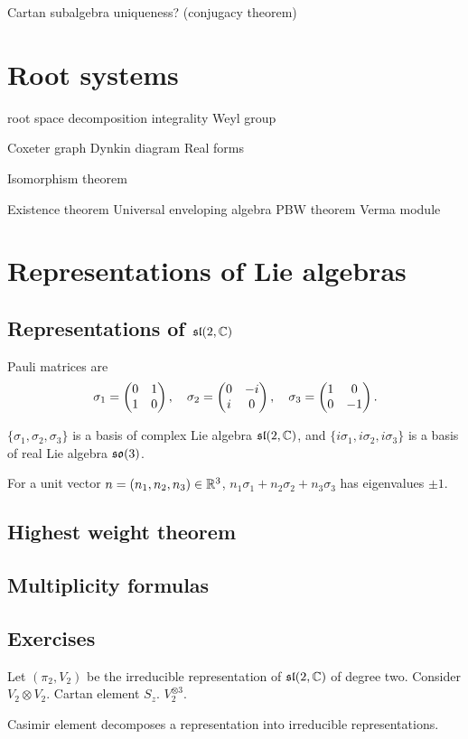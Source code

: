 \documentclass{../../large}
\begin{document}
\begin{prb}
Cartan subalgebra uniqueness? (conjugacy theorem)
\end{prb}




\chapter{Root systems}
root space decomposition
integrality
Weyl group

Coxeter graph
Dynkin diagram
Real forms

Isomorphism theorem

Existence theorem
Universal enveloping algebra
PBW theorem
Verma module




\chapter{Representations of Lie algebras}
\section{Representations of $\mathfrak{sl}(2,\mathbb{C})$}
\begin{prb}
Pauli matrices are
\[\sigma_1=\begin{pmatrix}0&1\\1&0\end{pmatrix},\quad\sigma_2=\begin{pmatrix}0&-i\\i&0\end{pmatrix},\quad\sigma_3=\begin{pmatrix}1&0\\0&-1\end{pmatrix}.\]
\begin{parts}
\item $\{\sigma_1,\sigma_2,\sigma_3\}$ is a basis of complex Lie algebra $\mathfrak{sl}(2,\mathbb{C})$, and $\{i\sigma_1,i\sigma_2,i\sigma_3\}$ is a basis of real Lie algebra $\mathfrak{so}(3)$.
\item For a unit vector $n=(n_1,n_2,n_3)\in\mathbb{R}^3$, $n_1\sigma_1+n_2\sigma_2+n_3\sigma_3$ has eigenvalues $\pm1$.
\end{parts}
\end{prb}
\section{Highest weight theorem}

\section{Multiplicity formulas}

\section*{Exercises}
\begin{prb}
Let $(\pi_2,V_2)$ be the irreducible representation of $\mathfrak{sl}(2,\mathbb{C})$ of degree two.
Consider $V_2\otimes V_2$.
Cartan element $S_z$.
$V_2^{\otimes3}$.
\end{prb}
\begin{prb}
Casimir element decomposes a representation into irreducible representations.
\end{prb}
\end{document}
